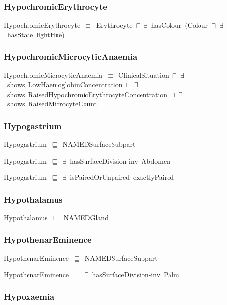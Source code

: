 \documentclass{article}
\begin{document}
\subsubsection*{HypochromicErythrocyte}

HypochromicErythrocyte~\ensuremath{\equiv}~Erythrocyte~\ensuremath{\sqcap}~\ensuremath{\exists}~hasColour~(Colour~\ensuremath{\sqcap}~\ensuremath{\exists}~hasState~lightHue)

\subsubsection*{HypochromicMicrocyticAnaemia}

HypochromicMicrocyticAnaemia~\ensuremath{\equiv}~ClinicalSituation~\ensuremath{\sqcap}~\ensuremath{\exists}~shows~LowHaemoglobinConcentration~\ensuremath{\sqcap}~\ensuremath{\exists}~shows~RaisedHypochromicErythrocyteConcentration~\ensuremath{\sqcap}~\ensuremath{\exists}~shows~RaisedMicrocyteCount

\subsubsection*{Hypogastrium}

Hypogastrium~\ensuremath{\sqsubseteq}~NAMEDSurfaceSubpart~

Hypogastrium~\ensuremath{\sqsubseteq}~\ensuremath{\exists}~hasSurfaceDivision-inv~Abdomen~

Hypogastrium~\ensuremath{\sqsubseteq}~\ensuremath{\exists}~isPairedOrUnpaired~exactlyPaired~

\subsubsection*{Hypothalamus}

Hypothalamus~\ensuremath{\sqsubseteq}~NAMEDGland~

\subsubsection*{HypothenarEminence}

HypothenarEminence~\ensuremath{\sqsubseteq}~NAMEDSurfaceSubpart~

HypothenarEminence~\ensuremath{\sqsubseteq}~\ensuremath{\exists}~hasSurfaceDivision-inv~Palm~

\subsubsection*{Hypoxaemia}
\end{document}
